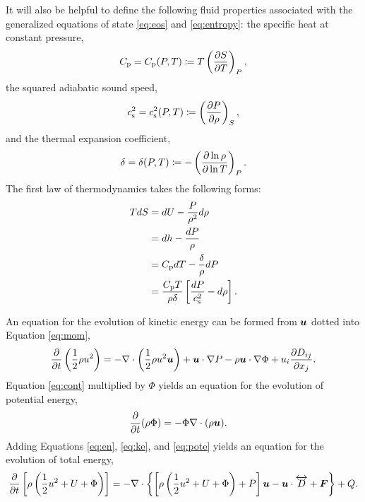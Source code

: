 \documentclass[12pt]{article}
\newcommand{\vecf}{\bm{F}}
\begin{document}
	It will also be helpful to define the following fluid properties associated with the generalized equations of state \eqref{eq:eos} and \eqref{eq:entropy}: the specific heat at constant pressure, 
	\begin{align}\label{eq:cp}
		C_{\rm{p}}=C_{\rm{p}}(P,T)\coloneqq T\left(\frac{\partial S}{\partial T}\right)_P,
	\end{align}
	the squared adiabatic sound speed,
	\begin{align}\label{eq:cs2}
		c_{\rm s}^2=c_{\rm s}^2(P,T)\coloneqq \left(\frac{\partial P}{\partial\rho}\right)_S,
	\end{align}
	and the thermal expansion coefficient,
	\begin{align}
		\delta=\delta(P,T)\coloneqq-\left(\frac{\partial\ln\rho}{\partial\ln T}\right)_P.
	\end{align}
	The first law of thermodynamics takes the following forms:
	\begin{subequations}\label{eq:firstlaw}
	\begin{align}
		TdS &= dU - \frac{P}{\rho^2}d\rho \\
		&= dh - \frac{dP}{\rho}\\
		&= C_{\rm{p}} dT - \frac{\delta}{\rho}dP\\
		&=\frac{C_{\rm{p}} T}{\rho\delta}\left[\frac{dP}{c_{\rm s}^2}-d\rho\right].
	\end{align}
	\end{subequations}
	
	An equation for the evolution of kinetic energy can be formed from $\bm{u}$ dotted into Equation \eqref{eq:mom},
	\begin{align}\label{eq:ke}
		\frac{\partial}{\partial t}\left(\frac{1}{2}\rho u^2\right) = - \nabla\cdot\left(\frac{1}{2}\rho u^2\bm{u} \right) + \bm{u}\cdot\nabla P - \rho\bm{u}\cdot\nabla\Phi+ u_i\frac{\partial D_{ij}}{\partial x_j}.
	\end{align}
	Equation \eqref{eq:cont} multiplied by $\Phi$ yields an equation for the evolution of potential energy,
	\begin{align}\label{eq:pote}
		\frac{\partial}{\partial t}(\rho\Phi) &= - \Phi \nabla\cdot(\rho\bm{u}).
	\end{align}
	Adding Equations \eqref{eq:en}, \eqref{eq:ke}, and \eqref{eq:pote} yields an equation for the evolution of total energy,
	\begin{align}\label{eq:tote}
		\pderiv{}{t}\left[\rho\left(\frac{1}{2} u^2 + U + \Phi\right)\right] = -\Div\left\{\left[\rho\left(\frac{1}{2} u^2 + U + \Phi\right) + P\right]\vecu- \vecu\cdot\overleftrightarrow{D} + \vecf\right\} + Q.
	\end{align}
\end{document}
